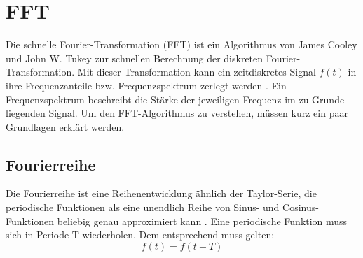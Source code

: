 





\section{FFT}

Die schnelle Fourier-Transformation (FFT) ist ein Algorithmus von  James Cooley und John W. Tukey zur schnellen Berechnung der diskreten Fourier-Transformation. Mit dieser Transformation kann ein zeitdiskretes Signal $f(t)$ in ihre Frequenzanteile bzw. Frequenzspektrum zerlegt werden \cite[S.14]{hejobu 84}. Ein Frequenzspektrum beschreibt die Stärke der jeweiligen Frequenz im zu Grunde liegenden Signal. Um den FFT-Algorithmus zu verstehen, müssen kurz ein paar Grundlagen erklärt werden.


\subsection{Fourierreihe}

Die Fourierreihe ist eine Reihenentwicklung ähnlich der Taylor-Serie, die periodische Funktionen als eine unendlich Reihe von Sinus- und Cosinus-Funktionen beliebig genau approximiert kann \cite[K. 11.4]{krenor 11}. Eine periodische Funktion muss sich in Periode T wiederholen. Dem entsprechend muss gelten:
\begin{equation}
f(t) = f(t + T)
\end{equation}

